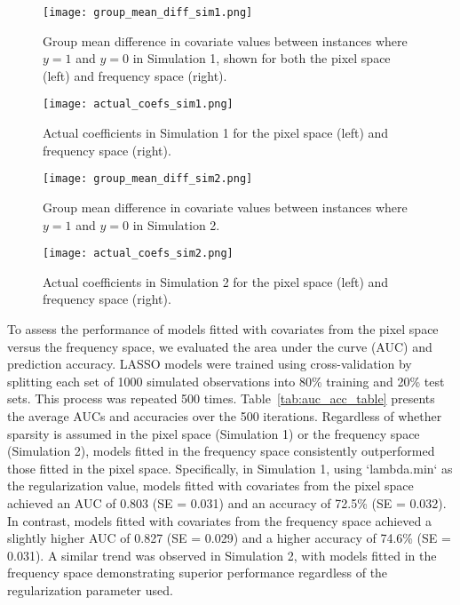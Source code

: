 \documentclass[12pt]{article}
\begin{document}
\begin{figure}[htbp] 
	\centering
	\texttt{[image: group\_mean\_diff\_sim1.png]}
	\caption{Group mean difference in covariate values between instances where \( y = 1 \) and \( y = 0 \) in Simulation
  1, shown for both the pixel space (left) and frequency space (right).}
	\label{fig:group_diff1}
\end{figure}

\begin{figure}[htbp] 
	\centering
	\texttt{[image: actual\_coefs\_sim1.png]}
  \caption{Actual coefficients in Simulation 1 for the pixel space (left) and frequency space (right).}
  \label{fig:coefs_sim1}
\end{figure}

\begin{figure}[htbp] 
	\centering
	\texttt{[image: group\_mean\_diff\_sim2.png]}
	\caption{Group mean difference in covariate values between instances where \( y = 1 \) and \( y = 0 \) in Simulation 2.}
	\label{fig:group_diff2}
\end{figure}

\begin{figure}[htbp] 
	\centering
	\texttt{[image: actual\_coefs\_sim2.png]}
  \caption{Actual coefficients in Simulation 2 for the pixel space (left) and frequency space (right).}
  \label{fig:coefs_sim2}
\end{figure}

To assess the performance of models fitted with covariates from the pixel space versus the frequency space, we evaluated
the area under the curve (AUC) and prediction accuracy. LASSO models were trained using cross-validation by splitting
each set of 1000 simulated observations into 80\% training and 20\% test sets. This process was repeated 500 times.
Table~\ref*{tab:auc_acc_table} presents the average AUCs and accuracies over the 500 iterations. Regardless of whether
sparsity is assumed in the pixel space (Simulation 1) or the frequency space (Simulation 2), models fitted in the
frequency space consistently outperformed those fitted in the pixel space. Specifically, in Simulation 1, using
`lambda.min` as the regularization value,  models fitted with covariates from the pixel space achieved an AUC of
0.803 (SE = 0.031) and an accuracy of 72.5\% (SE = 0.032). In contrast, models fitted with covariates from the 
frequency space achieved a slightly higher AUC of 0.827 (SE = 0.029) and a higher accuracy of
74.6\% (SE = 0.031). A similar trend was observed in Simulation 2, with models fitted in the frequency space
demonstrating superior performance regardless of the regularization parameter used.
\end{document}
